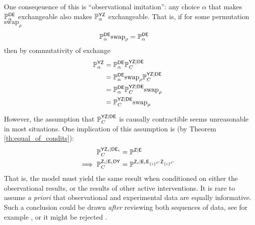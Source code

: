 One conseqeuence of this is ``observational imitation'': any choice $\alpha$ that makes $\mathbb{P}_\alpha^{\mathsf{D}\mathsf{E}}$ exchangeable also makes $\mathbb{P}_\alpha^{\mathsf{YZ}}$ exchangeable. That is, if for some permutation $\mathrm{swap}_\rho$
\begin{align}
    \mathbb{P}_\alpha^{\mathsf{DE}}\mathrm{swap}_\rho &= \mathbb{P}_\alpha^{\mathsf{DE}}
\end{align}
then by commutativity of exchange
\begin{align}
    \mathbb{P}_\alpha^{\mathsf{YZ}} &= \mathbb{P}_\alpha^{\mathsf{DE}} \mathbb{P}_C^{\mathsf{YZ}|\mathsf{DE}}\\
    &=  \mathbb{P}_\alpha^{\mathsf{DE}}\mathrm{swap}_\rho \mathbb{P}_C^{\mathsf{YZ}|\mathsf{DE}}\\
    &= \mathbb{P}_\alpha^{\mathsf{DE}} \mathbb{P}_C^{\mathsf{YZ}|\mathsf{DE}}\mathrm{swap}_\rho\\
    &= \mathbb{P}_C^{\mathsf{YZ}|\mathsf{DE}}\mathrm{swap}_\rho
\end{align}

However, the assumption that $\mathbb{P}_C^{\mathsf{YZ}|\mathsf{DE}}$ is causally contractible seems unreasonable in most situations. One implication of this assumption is (by Theorem \ref{th:equal_of_condits}):
\begin{align}
    \mathbb{P}^{\mathsf{Y}\mathsf{Z}_i|\mathsf{D}\mathsf{E}_i}_C &= \mathbb{P}^{\mathsf{Z}|\mathsf{E}}\\
    \implies \mathbb{P}^{\mathsf{Z}_i|\mathsf{E}_i\mathsf{D}\mathsf{Y}}_C &= \mathbb{P}^{\mathsf{Z}_{i}|\mathsf{E}_i\mathsf{E}_{\{i\}^C}\mathsf{Z}_{\{i\}^C}}
\end{align}
That is, the model must yield the same result when conditioned on either the observational results, or the results of other active interventions. It is rare to assume \emph{a priori} that observational and experimental data are equally informative. Such a conclusion could be drawn \emph{after} reviewing both sequences of data, see for example \citet{eckles_bias_2021}, or it might be rejected \citet{gordon_comparison_2018,gordon_close_2022}.

